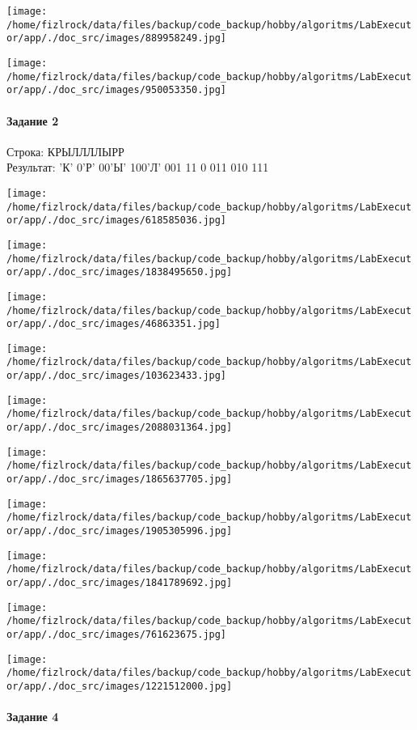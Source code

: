 \documentclass[a4paper, 12pt]{article}
\begin{document}
\texttt{[image: /home/fizlrock/data/files/backup/code\_backup/hobby/algoritms/LabExecutor/app/./doc\_src/images/889958249.jpg]}

\texttt{[image: /home/fizlrock/data/files/backup/code\_backup/hobby/algoritms/LabExecutor/app/./doc\_src/images/950053350.jpg]}
\pagebreak
\paragraph{Задание 2}

Строка: 
КРЫЛЛЛЛЫРР\\
Результат: 'К' 0'Р' 00'Ы' 100'Л' 001 11 0 011 010 111

\texttt{[image: /home/fizlrock/data/files/backup/code\_backup/hobby/algoritms/LabExecutor/app/./doc\_src/images/618585036.jpg]}

\texttt{[image: /home/fizlrock/data/files/backup/code\_backup/hobby/algoritms/LabExecutor/app/./doc\_src/images/1838495650.jpg]}

\texttt{[image: /home/fizlrock/data/files/backup/code\_backup/hobby/algoritms/LabExecutor/app/./doc\_src/images/46863351.jpg]}

\texttt{[image: /home/fizlrock/data/files/backup/code\_backup/hobby/algoritms/LabExecutor/app/./doc\_src/images/103623433.jpg]}

\texttt{[image: /home/fizlrock/data/files/backup/code\_backup/hobby/algoritms/LabExecutor/app/./doc\_src/images/2088031364.jpg]}

\texttt{[image: /home/fizlrock/data/files/backup/code\_backup/hobby/algoritms/LabExecutor/app/./doc\_src/images/1865637705.jpg]}

\texttt{[image: /home/fizlrock/data/files/backup/code\_backup/hobby/algoritms/LabExecutor/app/./doc\_src/images/1905305996.jpg]}

\texttt{[image: /home/fizlrock/data/files/backup/code\_backup/hobby/algoritms/LabExecutor/app/./doc\_src/images/1841789692.jpg]}

\texttt{[image: /home/fizlrock/data/files/backup/code\_backup/hobby/algoritms/LabExecutor/app/./doc\_src/images/761623675.jpg]}

\texttt{[image: /home/fizlrock/data/files/backup/code\_backup/hobby/algoritms/LabExecutor/app/./doc\_src/images/1221512000.jpg]}
\pagebreak
\paragraph{Задание 4}
\end{document}
